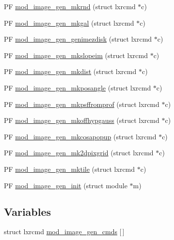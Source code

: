 \begin{DoxyCompactItemize}
P\+F \hyperlink{PIAACMCdesign_2src_2image__gen_2image__gen-util_8c_a07401df65054a16dde93b91c71d30e87}{mod\+\_\+image\+\_\+gen\+\_\+mkrnd} (struct lxrcmd $\ast$c)
\item 
P\+F \hyperlink{PIAACMCdesign_2src_2image__gen_2image__gen-util_8c_a92a1d5daf076e57bb4050df292498dbb}{mod\+\_\+image\+\_\+gen\+\_\+mkgal} (struct lxrcmd $\ast$c)
\item 
P\+F \hyperlink{PIAACMCdesign_2src_2image__gen_2image__gen-util_8c_a1890dde947828ecf0db0ae31ab8fe323}{mod\+\_\+image\+\_\+gen\+\_\+genimezdisk} (struct lxrcmd $\ast$c)
\item 
P\+F \hyperlink{PIAACMCdesign_2src_2image__gen_2image__gen-util_8c_a2ae4393654913c334053966b038c1e51}{mod\+\_\+image\+\_\+gen\+\_\+mkslopeim} (struct lxrcmd $\ast$c)
\item 
P\+F \hyperlink{PIAACMCdesign_2src_2image__gen_2image__gen-util_8c_abe4d5f47d07a88f8471d7fd98ea0088e}{mod\+\_\+image\+\_\+gen\+\_\+mkdist} (struct lxrcmd $\ast$c)
\item 
P\+F \hyperlink{PIAACMCdesign_2src_2image__gen_2image__gen-util_8c_a6f6b1ee7da2f1bf0f5dc75a09527333f}{mod\+\_\+image\+\_\+gen\+\_\+mkposangle} (struct lxrcmd $\ast$c)
\item 
P\+F \hyperlink{PIAACMCdesign_2src_2image__gen_2image__gen-util_8c_a14e84bbb654ac751fdd712ce247164b0}{mod\+\_\+image\+\_\+gen\+\_\+mkpsffromprof} (struct lxrcmd $\ast$c)
\item 
P\+F \hyperlink{PIAACMCdesign_2src_2image__gen_2image__gen-util_8c_ae821234a9154b6d81e509af455a602e6}{mod\+\_\+image\+\_\+gen\+\_\+mkoffhypgauss} (struct lxrcmd $\ast$c)
\item 
P\+F \hyperlink{PIAACMCdesign_2src_2image__gen_2image__gen-util_8c_a42da0c73d4d1136a5014c3047e12fa30}{mod\+\_\+image\+\_\+gen\+\_\+mkcosapopup} (struct lxrcmd $\ast$c)
\item 
P\+F \hyperlink{PIAACMCdesign_2src_2image__gen_2image__gen-util_8c_a2184de39a978f1cb17f72ccec538b5ce}{mod\+\_\+image\+\_\+gen\+\_\+mk2dpixgrid} (struct lxrcmd $\ast$c)
\item 
P\+F \hyperlink{PIAACMCdesign_2src_2image__gen_2image__gen-util_8c_a3860c261494668ad27c3d28f4df86ed5}{mod\+\_\+image\+\_\+gen\+\_\+mktile} (struct lxrcmd $\ast$c)
\item 
P\+F \hyperlink{PIAACMCdesign_2src_2image__gen_2image__gen-util_8c_a39f7d02a1dd93431130cc46b2ea9d12d}{mod\+\_\+image\+\_\+gen\+\_\+init} (struct module $\ast$m)
\end{DoxyCompactItemize}
\subsection*{Variables}
\begin{DoxyCompactItemize}
\item 
struct lxrcmd \hyperlink{PIAACMCdesign_2src_2image__gen_2image__gen-util_8c_a834a38cb923e0cb0137c34b26f209fb2}{mod\+\_\+image\+\_\+gen\+\_\+cmds} \mbox{[}$\,$\mbox{]}
\end{DoxyCompactItemize}


